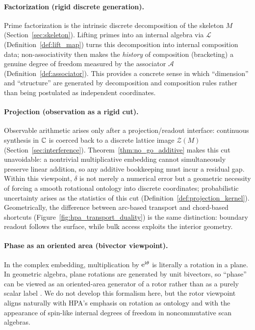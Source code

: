 \paragraph{Factorization (rigid discrete generation).}
Prime factorization is the intrinsic discrete decomposition of the skeleton $M$ (Section~\ref{sec:skeleton}).
Lifting primes into an internal algebra via $\mathcal{L}$ (Definition~\ref{def:lift_map}) turns this decomposition into internal composition data; non-associativity then makes the \emph{history} of composition (bracketing) a genuine degree of freedom measured by the associator $\mathcal{A}$ (Definition~\ref{def:associator}).
This provides a concrete sense in which ``dimension'' and ``structure'' are generated by decomposition and composition rules rather than being postulated as independent coordinates.

\paragraph{Projection (observation as a rigid cut).}
Observable arithmetic arises only after a projection/readout interface: continuous synthesis in $\mathbb{C}$ is coerced back to a discrete lattice image $\mathcal{Z}(M)$ (Section~\ref{sec:interference}).
Theorem~\ref{thm:no_go_additive} makes this cut unavoidable: a nontrivial multiplicative embedding cannot simultaneously preserve linear addition, so any additive bookkeeping must incur a residual gap.
Within this viewpoint, $\delta$ is not merely a numerical error but a geometric necessity of forcing a smooth rotational ontology into discrete coordinates; probabilistic uncertainty arises as the statistics of this cut (Definition~\ref{def:projection_kernel}).
Geometrically, the difference between arc-based transport and chord-based shortcuts (Figure~\ref{fig:hpa_transport_duality}) is the same distinction: boundary readout follows the surface, while bulk access exploits the interior geometry.

\paragraph{Phase as an oriented area (bivector viewpoint).}
In the complex embedding, multiplication by $\mathrm{e}^{\mathrm{i}\theta}$ is literally a rotation in a plane.
In geometric algebra, plane rotations are generated by unit bivectors, so ``phase'' can be viewed as an oriented-area generator of a rotor rather than as a purely scalar label \cite{DoranLasenby2003}.
We do not develop this formalism here, but the rotor viewpoint aligns naturally with HPA's emphasis on rotation as ontology and with the appearance of spin-like internal degrees of freedom in noncommutative scan algebras.

